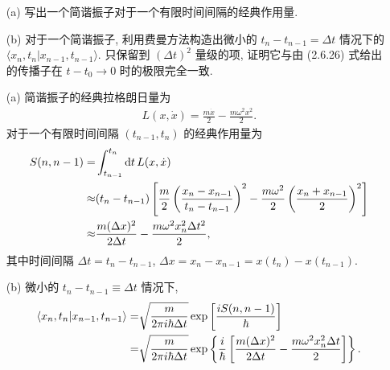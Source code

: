 \documentclass{assignment}
\begin{document}
\begin{prob}[课本习题 2.34]
    \begin{itemize}
        \item[(a)] 写出一个简谐振子对于一个有限时间间隔的经典作用量.
        \item[(b)] 对于一个简谐振子, 利用费曼方法构造出微小的 $t_n-t_{n-1}=\Delta t$ 情况下的 $\langle x_n,t_n\vert x_{n-1},t_{n-1}\rangle$. 只保留到 $(\Delta t)^2$ 量级的项, 证明它与由 (2.6.26) 式给出的传播子在 $t-t_0\rightarrow 0$ 时的极限完全一致.
    \end{itemize}
\end{prob}
\begin{sol}
    \begin{itemize}
        \item[(a)] 简谐振子的经典拉格朗日量为
        \begin{align}
            L(x,\dot{x})=\frac{m\dot{x}}{2}-\frac{m\omega^2x^2}{2}.
        \end{align}
        对于一个有限时间间隔 $(t_{n-1},t_n)$ 的经典作用量为
        \begin{align}
            \notag S(n,n-1)=&\int_{t_{n-1}}^{t_n}\mathrm{d}t\,L(x,\dot{x})\\
            \notag\approx&(t_n-t_{n-1})\left[\frac{m}{2}\left(\frac{x_n-x_{n-1}}{t_n-t_{n-1}}\right)^2-\frac{m\omega^2}{2}\left(\frac{x_n+x_{n-1}}{2}\right)^2\right]\\
            \approx&\frac{m(\Delta x)^2}{2\Delta t}-\frac{m\omega^2x_n^2\Delta t^2}{2},
        \end{align}
        其中时间间隔 $\Delta t=t_n-t_{n-1}$, $\Delta x=x_n-x_{n-1}=x(t_n)-x(t_{n-1})$.
        \item[(b)] 微小的 $t_n-t_{n-1}\equiv\Delta t$ 情况下,
        \begin{align}
            \notag\langle x_n,t_n\vert x_{n-1},t_{n-1}\rangle=&\sqrt{\frac{m}{2\pi i\hbar\Delta t}}\exp\left[\frac{iS(n,n-1)}{\hbar}\right]\\
            =&\sqrt{\frac{m}{2\pi i\hbar\Delta t}}\exp\left\{\frac{i}{\hbar}\left[\frac{m(\Delta x)^2}{2\Delta t}-\frac{m\omega^2x_n^2\Delta t}{2}\right]\right\}.
        \end{align}


\end{itemize}
\end{sol}
\end{document}
